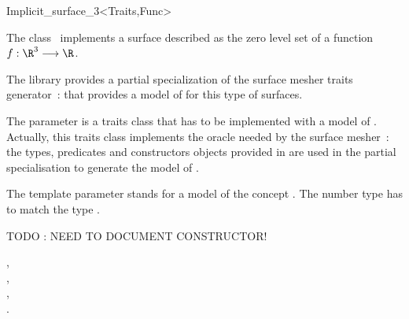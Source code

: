 

\begin{ccRefClass}{Implicit_surface_3<Traits,Func>}


\ccDefinition
  
The class \ccRefName\  implements a surface described 
as the zero level
set  of a function $f : \R^3 \longrightarrow \R$.


The library provides a partial specialization
of the  surface mesher traits generator~:
that provides a model of  for this type of surfaces.


The parameter  is a traits class 
that has to be implemented with a model of 
.
Actually, this traits class implements the oracle needed by the
surface mesher~:
the types, predicates and constructors objects provided
in  are
used in 
the partial specialisation 
to generate the model of  .

The template parameter   stands for a model
of the concept .
The number type  has to match
the type .

TODO : NEED TO DOCUMENT CONSTRUCTOR!


\ccSeeAlso
{},\\
,\\
, \\
.

\end{ccRefClass}


